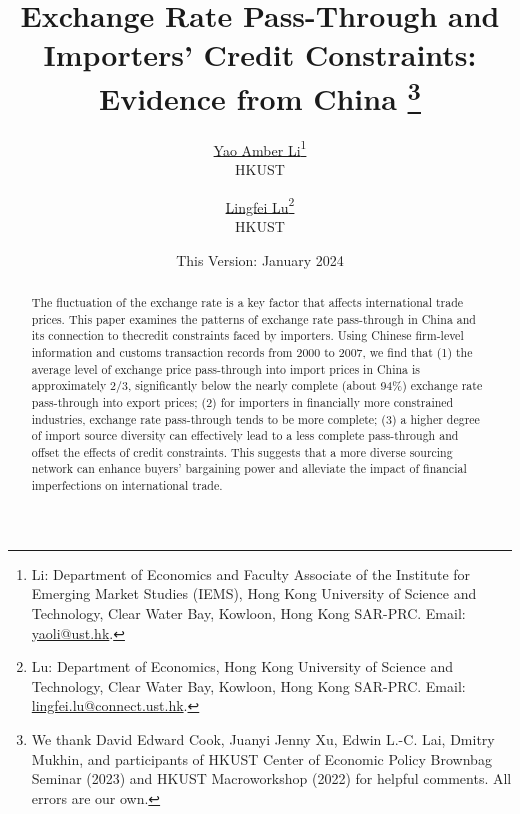 

\linespread{1.2}
\geometry{a4paper,scale=0.75}



\title{  \Large \textbf{Exchange Rate Pass-Through and Importers' Credit Constraints: Evidence from China} 
\thanks{We thank David Edward Cook, Juanyi Jenny Xu, Edwin L.-C. Lai, Dmitry Mukhin, and participants of HKUST Center of Economic Policy Brownbag Seminar (2023) and HKUST Macroworkshop (2022) for helpful comments. All errors are our own.}}

\author{\large \href{http://yaoli.people.ust.hk/}{Yao Amber Li}\thanks{Li: Department of Economics and Faculty Associate of the Institute for Emerging Market Studies (IEMS), Hong Kong University of Science and Technology, Clear Water Bay, Kowloon, Hong Kong SAR-PRC. Email: \href{mailto:yaoli@ust.hk}{yaoli@ust.hk}.}\\ \large{HKUST}
\and \large \href{}{Lingfei Lu}\thanks{Lu: Department of Economics, Hong Kong University of Science and Technology, Clear Water Bay, Kowloon, Hong Kong SAR-PRC. Email: \href{mailto:}{lingfei.lu@connect.ust.hk}.} \\ \large{HKUST}
 }

\date{This Version: January 2024}

\maketitle

\begin{abstract}
The fluctuation of the exchange rate is a key factor that affects international trade prices. This paper examines the patterns of exchange rate pass-through in China and its connection to thecredit constraints faced by importers. Using Chinese firm-level information and customs transaction records from 2000 to 2007, we find that (1) the average level of exchange price pass-through into import prices in China is approximately 2/3, significantly below the nearly complete (about 94\%) exchange rate pass-through into export prices; (2) for importers in financially more constrained industries, exchange rate pass-through tends to be more complete; (3) a higher degree of import source diversity can effectively lead to a less complete pass-through and offset the effects of credit constraints. This suggests that a more diverse sourcing network can enhance buyers' bargaining power and alleviate the impact of financial imperfections on international trade.

\end{abstract}


